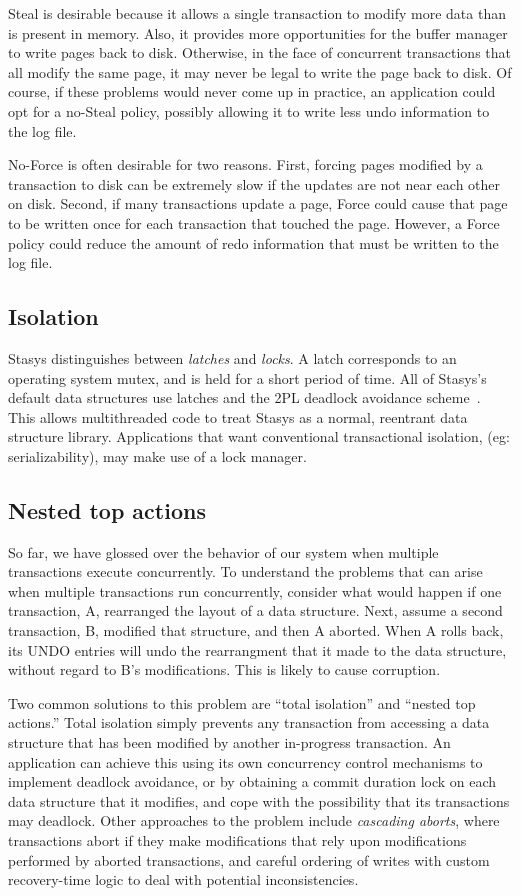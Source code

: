 \documentclass[letterpaper,twocolumn,10pt]{article}
\newcommand{\yad}{Stasys\xspace}
\begin{document}
Steal is desirable because it allows a single transaction to modify
more data than is present in memory.  Also, it provides more
opportunities for the buffer manager to write pages back to disk.
Otherwise, in the face of concurrent transactions that all modify the
same page, it may never be legal to write the page back to disk.  Of
course, if these problems would never come up in practice, an
application could opt for a no-Steal policy, possibly allowing it to
write less undo information to the log file.

No-Force is often desirable for two reasons.  First, forcing pages
modified by a transaction to disk can be extremely slow if the updates
are not near each other on disk.  Second, if many transactions update
a page, Force could cause that page to be written once for each transaction
that touched the page.  However, a Force policy could reduce the
amount of redo information that must be written to the log file.

\subsection{Isolation}

\yad distinguishes between {\em latches} and {\em locks}.  A latch
corresponds to an operating system mutex, and is held for a short
period of time.  All of \yad's default data structures use latches and
the 2PL deadlock avoidance scheme~\cite{twoPhaseLocking}.  This allows multithreaded code to treat
\yad as a normal, reentrant data structure library.  Applications that
want conventional transactional isolation, (eg: serializability), may
make use of a lock manager.

\subsection{Nested top actions}

So far, we have glossed over the behavior of our system when multiple
transactions execute concurrently.  To understand the problems that
can arise when multiple transactions run concurrently, consider what
would happen if one transaction, A, rearranged the layout of a data
structure.  Next, assume a second transaction, B, modified that
structure, and then A aborted.  When A rolls back, its UNDO entries
will undo the rearrangment that it made to the data structure, without
regard to B's modifications.  This is likely to cause corruption.

Two common solutions to this problem are ``total isolation'' and
``nested top actions.''  Total isolation simply prevents any
transaction from accessing a data structure that has been modified by
another in-progress transaction.  An application can achieve this
using its own concurrency control mechanisms to implement deadlock
avoidance, or by obtaining a commit duration lock on each data
structure that it modifies, and cope with the possibility that its
transactions may deadlock.  Other approaches to the problem include
{\em cascading aborts}, where transactions abort if they make
modifications that rely upon modifications performed by aborted
transactions, and careful ordering of writes with custom recovery-time
logic to deal with potential inconsistencies.  
\end{document}
